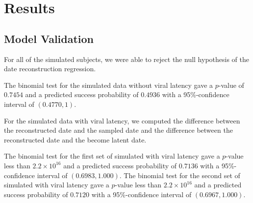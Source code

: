 \documentclass[12pt]{article}
\begin{document}
\section * {Results} \label{sec:results}


\subsection * {Model Validation} \label{sec:sim_results}
For all of the simulated subjects, we were able to reject the null hypothesis of the date reconstruction regression.

The {binomial test} for the simulated data without viral latency gave a $p$-value of $0.7454$ and a predicted success probability of $0.4936$ with a 95\%-confidence interval of $(0.4770, 1)$.


For the simulated data with viral latency, we computed the difference between the reconstructed date and the sampled date and the difference between the reconstructed date and the become latent date.

The {binomial test} for the first set of simulated with viral latency gave a $p$-value less than $2.2\times 10^{16}$ and a predicted success probability of $0.7136$ with a 95\%-confidence interval of $(0.6983, 1.000)$. The {binomial test} for the second set of simulated with viral latency gave a $p$-value less than $2.2\times 10^{16}$ and a predicted success probability of $0.7120$ with a 95\%-confidence interval of $(0.6967, 1.000)$.
\end{document}
